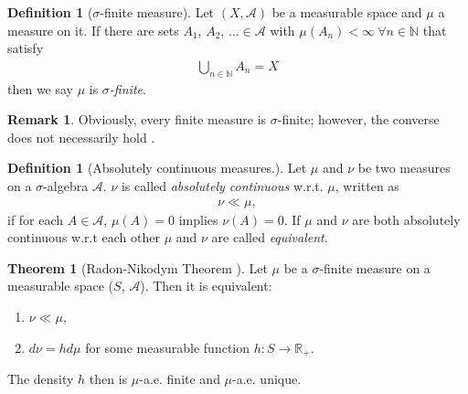 \documentclass[12pt, a4paper]{article}
\numberwithin{equation}{section}
\theoremstyle{definition}
\theoremstyle{definition}
\newtheorem{defn}[thm]{Definition} %
\newtheorem{remark}[thm]{Remark} %
\newtheorem{theorem}[thm]{Theorem}
\begin{document}
	\begin{defn}[$\sigma$-finite measure] Let $(X, \mathcal A)$ be a measurable space and $\mu$ a measure on it. If there are sets $A_1$, $A_2$, $\dots \in \mathcal A$ with $\mu(A_n) < \infty \ \forall n\in \mathbb N$ that satisfy 
	\begin{align}
		\bigcup_{n\in\mathbb N}A_n = X
	\end{align}  
	then we say $\mu$ is \textit{$\sigma$-finite}. 
	\end{defn}

	\begin{remark}
		Obviously, every finite measure is $\sigma$-finite; however, the converse does not necessarily hold \cite{sigma-finite}. 
	\end{remark}
	
	
	\begin{defn}[Absolutely continuous measures.] 
	Let $\mu$ and $\nu$ be two measures on a $\sigma$-algebra $\mathcal A$. $\nu$ is called \textit{absolutely continuous} w.r.t. $\mu$, written as 
		\begin{align}
			\nu \ll \mu, 
		\end{align}
	if for each $A\in \mathcal A$, $\mu(A) = 0$ implies $\nu(A) = 0$. If $\mu$ and $\nu$ are both absolutely continuous w.r.t each other $\mu$ and $\nu$ are called \textit{equivalent}. 
	\end{defn}

	\begin{theorem}[Radon-Nikodym Theorem \cite{measure-integration}]
	Let $\mu$ be a $\sigma$-finite measure on a measurable space ($S$, $\mathcal{A}$). Then it is equivalent: 
		\begin{enumerate}
			\item $\nu \ll \mu$, 
			\item $d\nu = hd\mu$ for some measurable function $h: S\rightarrow \mathbb R_{+}$. 
		\end{enumerate}
	The density $h$ then is $\mu$-a.e. finite and $\mu$-a.e. unique. 
	\end{theorem}
	
\end{document}
